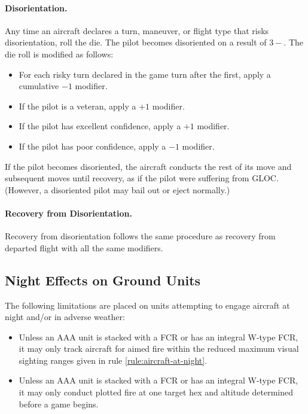 \begin{advancedrules}
{\paragraph{Disorientation.} Any time an aircraft declares a turn, maneuver, or flight type that risks disorientation, roll the die. The pilot becomes disoriented on a result of $3-$. The die roll is modified as follows:
\begin{itemize}
    \item For each risky turn declared in the game turn after the first, apply a cumulative $-1$ modifier.
    \item If the pilot is a veteran, apply a $+1$ modifier.
    \item If the pilot has excellent confidence, apply a $+1$ modifier.
    \item If the pilot has poor confidence, apply a $-1$ modifier.
\end{itemize}

If the pilot becomes disoriented, the aircraft conducts the rest of its move and subsequent moves until recovery, as if the pilot were suffering from GLOC. (However, a disoriented pilot may bail out or eject normally.)

\paragraph{Recovery from Disorientation.} Recovery from disorientation follows the same procedure as recovery from departed flight with all the same modifiers.

\subsection{Night Effects on Ground Units} The following limitations are placed on units attempting to engage aircraft at night and/or in adverse weather:

\begin{itemize}

    \item Unless an AAA unit is stacked with a FCR or has an integral W-type FCR, it may only track aircraft for aimed fire within the reduced maximum visual sighting ranges given in rule \ref{rule:aircraft-at-night}. 

    \item Unless an AAA unit is stacked with a FCR or has an integral W-type FCR, it may only conduct plotted fire at one target hex and altitude determined before a game begins.


\end{itemize}}
\end{advancedrules}
